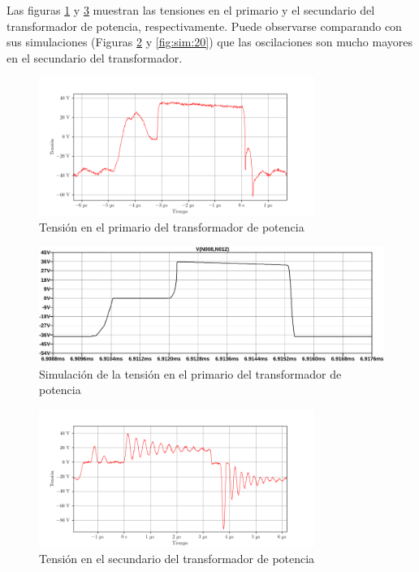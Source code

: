 Las figuras \ref{fig:osc:38} y \ref{fig:osc:40} muestran las tensiones en el primario y el secundario del transformador de potencia, respectivamente. Puede observarse comparando con sus simulaciones (Figuras \ref{fig:sim:19} y \ref{fig:sim:20}) que las oscilaciones son mucho mayores en el secundario del transformador.

\begin{figure}[H]
    \centering
    \includegraphics[width=0.8\textwidth]{images/capturas-osciloscopio/17-11-2022/38.png}
    \caption{Tensión en el primario del transformador de potencia}
    \label{fig:osc:38}
\end{figure}

\begin{figure}[H]
    \centering
    \includegraphics[width=\textwidth]{images/sim/19.pdf}
    \caption{Simulación de la tensión en el primario del transformador de potencia}
    \label{fig:sim:19}
\end{figure}

\begin{figure}[H]
    \centering
    \includegraphics[width=0.8\textwidth]{images/capturas-osciloscopio/17-11-2022/40.png}
    \caption{Tensión en el secundario del transformador de potencia}
    \label{fig:osc:40}
\end{figure}

